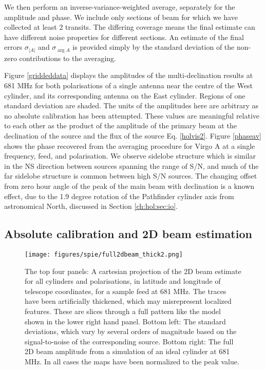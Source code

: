We then perform an inverse-variance-weighted average, separately for the amplitude and phase. We include only sections of beam for which we have collected at least 2 transits. The differing coverage means the final estimate can have different noise properties for different sections. An estimate of the final errors $\sigma_{|A|}$ and $\sigma_{\arg{A}}$ is provided simply by the standard deviation of the non-zero contributions to the averaging.

Figure \ref{griddeddata} displays the amplitudes of the multi-declination results at 681 MHz for both polarisations of a single antenna near the centre of the West cylinder, and its corresponding antenna on the East cylinder. Regions of one standard deviation are shaded. The units of the amplitudes here are arbitrary as no absolute calibration has been attempted. These values are meaningful relative to each other as the product of the amplitude of the primary beam at the declination of the source and the flux of the source Eq. \ref{holvis2}. Figure \ref{phaseav} shows the phase recovered from the averaging procedure for Virgo A at a single frequency, feed, and polarisation. We observe sidelobe structure which is similar in the NS direction between sources spanning the range of S/N, and much of the far sidelobe structure is common between high S/N sources. The changing offset from zero hour angle of the peak of the main beam with declination is a known effect, due to the 1.9 degree rotation of the Pathfinder cylinder axis from astronomical North, discussed in Section \ref{ch:hol:sec:io}.

\subsection{Absolute calibration and 2D beam estimation}

\begin{figure}[h!] %
	\centering
	\texttt{[image: figures/spie/full2dbeam\_thick2.png]}%
	\caption{The top four panels: A cartesian projection of the 2D beam estimate for all cylinders and polarisations, in latitude and longitude of telescope coordinates, for a sample feed at 681 MHz. The traces have been artificially thickened, which may misrepresent localized features. These are slices through a full pattern like the model shown in the lower right hand panel. Bottom left: The standard deviations, which vary by several orders of magnitude based on the signal-to-noise of the corresponding source. Bottom right: The full 2D beam amplitude from a simulation of an ideal cylinder at 681 MHz. In all cases the maps have been normalized to the peak value.}
	\label{2dbeamslices}
\end{figure}

